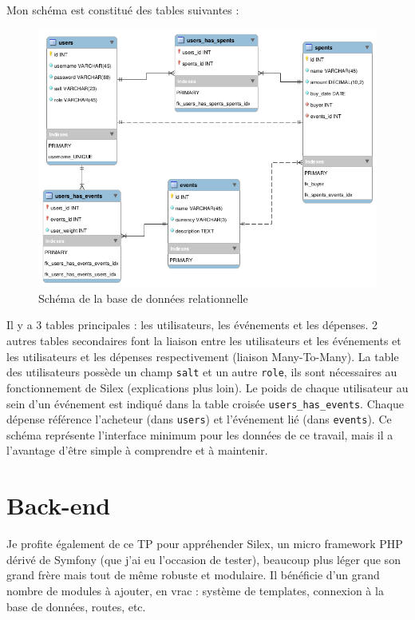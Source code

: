\documentclass[a4paper, 12pt]{article}
\begin{document}
Mon schéma est constitué des tables suivantes :
\begin{figure}
	\begin{center}
		\includegraphics[width=1.0\textwidth]{database.png}
	\end{center}
	\caption{Schéma de la base de données relationnelle}
\end{figure}
Il y a 3 tables principales : les utilisateurs, les événements et les dépenses. 2 autres tables secondaires 
font la liaison entre les utilisateurs et les événements et les utilisateurs et les dépenses respectivement 
(liaison Many-To-Many). La table des utilisateurs possède un champ \texttt{salt} et un autre 
\texttt{role}, ils sont nécessaires au fonctionnement de Silex (explications plus loin). Le poids 
de chaque utilisateur au sein d'un événement est indiqué dans la table croisée 
\texttt{users_has_events}. 
Chaque dépense référence l'acheteur (dans \texttt{users}) et l'événement lié (dans \texttt
{events}). Ce schéma représente l'interface minimum pour les données de ce travail, mais il a l'avantage 
d'être simple à comprendre et à maintenir.

\section{Back-end}
Je profite également de ce TP pour appréhender Silex, un micro framework PHP dérivé de Symfony (que j'ai eu 
l'occasion de tester), beaucoup plus léger que son grand frère mais tout de même robuste et modulaire. Il 
bénéficie d'un grand nombre de modules à ajouter, en vrac : système de templates, connexion à la base de données, 
routes, etc.
\end{document}

